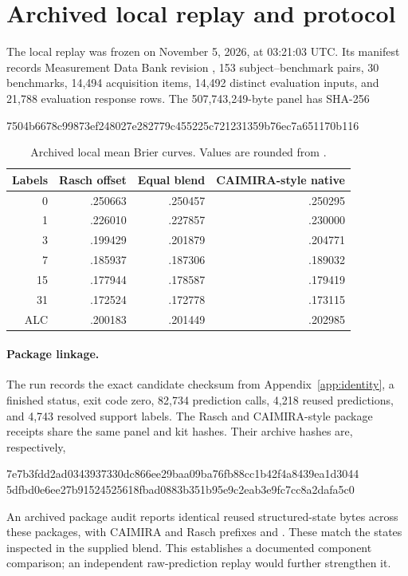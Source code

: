 \section{Archived local replay and protocol}
\label{app:local}
The local replay was frozen on November 5, 2026, at 03:21:03 UTC. Its manifest records Measurement Data Bank revision , 153 subject--benchmark pairs, 30 benchmarks, 14,494 acquisition items, 14,492 distinct evaluation inputs, and 21,788 evaluation response rows. The 507,743,249-byte panel has SHA-256
\begin{center}\small\ttfamily
7504b6678c99873ef248027e282779c455225c721231359b76ec7a651170b116
\end{center}

\begin{table}[H]
\centering
\caption{Archived local mean Brier curves. Values are rounded from .}
\small
\begin{tabular}{@{}rrrr@{}}
\toprule
Labels & Rasch offset & Equal blend & CAIMIRA-style native \\
\midrule
0 & .250663 & .250457 & .250295 \\
1 & .226010 & .227857 & .230000 \\
3 & .199429 & .201879 & .204771 \\
7 & .185937 & .187306 & .189032 \\
15 & .177944 & .178587 & .179419 \\
31 & .172524 & .172778 & .173115 \\
\midrule
ALC & .200183 & .201449 & .202985 \\
\bottomrule
\end{tabular}
\end{table}

\paragraph{Package linkage.}
The run  records the exact candidate checksum from Appendix~\ref{app:identity}, a finished status, exit code zero, 82,734 prediction calls, 4,218 reused predictions, and 4,743 resolved support labels. The Rasch and CAIMIRA-style package receipts share the same panel and kit hashes. Their archive hashes are, respectively,
\begin{center}\small\ttfamily
7e7b3fdd2ad0343937330dc866ee29baa09ba76fb88cc1b42f4a8439ea1d3044\\
5dfbd0e6ee27b91524525618fbad0883b351b95e9c2eab3e9fc7cc8a2dafa5c0
\end{center}
An archived package audit reports identical reused structured-state bytes across these packages, with CAIMIRA and Rasch prefixes  and . These match the states inspected in the supplied blend. This establishes a documented component comparison; an independent raw-prediction replay would further strengthen it.

